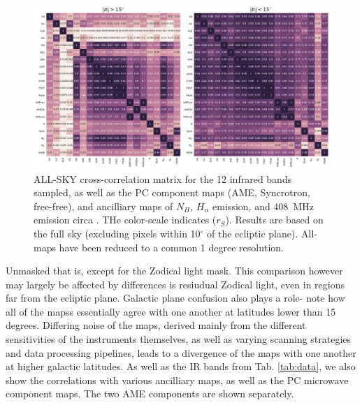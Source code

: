         \begin{figure}
          \includegraphics[width=\textwidth]{../Plots/ch_allsky/all_bands_corr_matrix_wAME_spearmanintensity_unmasked.pdf}
          \centering
          \caption{ALL-SKY cross-correlation matrix for the 12 infrared bands sampled, as well as the PC component maps (AME, Syncrotron, free-free), and ancilliary maps of $N_{H}$, $H_{\alpha}$ emission, and 408~MHz emission circa \cite{haslam82}. THe color-scale indicates ($r_{S}$). Results are based on the full sky (excluding pixels within 10$^{\circ}$ of the ecliptic plane). All-maps have been reduced to a common 1 degree resolution.}
          \label{fig:all_bands_corr_matrix_wAME_spearman}
        \end{figure}
        Unmasked that is, except for the Zodical light mask. This comparison however may largely be affected by differences is resiudual Zodical light, even in regions far from the ecliptic plane. Galactic plane confusion also plays a role- note how all of the mapss essentially agree with one another at latitudes lower than 15 degrees. Differing noise of the maps, derived mainly from the different sensitivities of the instruments themselves, as well as varying scanning strategies and data processing pipelines, leads to a divergence of the maps with one another at higher galactic latitudes. As well as the IR bands from Tab. \ref{tab:data}, we also show the correlations with various ancilliary maps, as well as the PC microwave component maps. The two AME components are shown separately.

